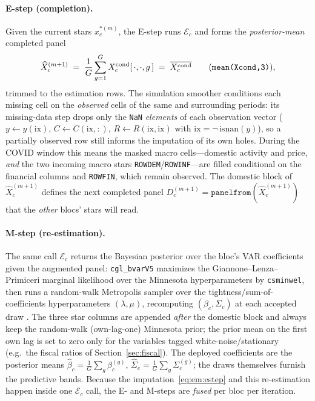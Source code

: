 \documentclass[11pt]{article}
\theoremstyle{definition}
\theoremstyle{remark}
\begin{document}
\paragraph{E-step (completion).} Given the current stars $x^{*(m)}_c$, the E-step
runs $\mathcal{E}_c$ and forms the \emph{posterior-mean} completed panel
\begin{equation}\label{eq:em:estep}
  \widehat{X}^{(m+1)}_c
  \;=\; \frac{1}{G}\sum_{g=1}^{G} X^{\text{cond}}_{c}[\,\cdot,\cdot,g\,]
  \;=\; \overline{X^{\text{cond}}_c}
  \qquad\text{(\texttt{mean(Xcond,3)})},
\end{equation}
trimmed to the estimation rows. The simulation smoother conditions each missing
cell on the \emph{observed} cells of the same and surrounding periods: its
missing-data step drops only the \texttt{NaN} \emph{elements} of each observation
vector ($y\!\leftarrow\!y(\mathrm{ix})$, $C\!\leftarrow\!C(\mathrm{ix},:)$,
$R\!\leftarrow\!R(\mathrm{ix},\mathrm{ix})$ with $\mathrm{ix}=\lnot\,\mathrm{isnan}(y)$),
so a partially observed row still informs the imputation of its own holes. During
the COVID window this means the masked macro cells---domestic activity and price,
\emph{and} the two incoming macro stars \texttt{ROWDEM}/\texttt{ROWINF}---are
filled conditional on the financial columns and \texttt{ROWFIN}, which remain
observed. The domestic block of $\widehat{X}^{(m+1)}_c$ defines the next
completed panel $D^{(m+1)}_c=\texttt{panelfrom}(\widehat{X}^{(m+1)}_c)$ that the
\emph{other} blocs' stars will read.

\paragraph{M-step (re-estimation).} The same call $\mathcal{E}_c$ returns the
Bayesian posterior over the bloc's VAR coefficients given the augmented panel:
\texttt{cgl\_bvarV5} maximizes the Giannone--Lenza--Primiceri marginal likelihood
over the Minnesota hyperparameters by \texttt{csminwel}, then runs a
random-walk Metropolis sampler over the tightness/sum-of-coefficients
hyperparameters $(\lambda,\mu)$, recomputing $(\beta_c,\Sigma_c)$ at each accepted
draw \citep{Giannone2015,BanburaGiannoneLenza2015}. The three star columns are
appended \emph{after} the domestic block and always keep the random-walk
(own-lag-one) Minnesota prior; the prior mean on the first own lag is set to zero
only for the variables tagged white-noise/stationary (e.g.\ the fiscal
ratios of Section~\ref{sec:fiscal}). The deployed coefficients are the
posterior means $\hat\beta_c=\frac1G\sum_g\beta_c^{(g)}$,
$\hat\Sigma_c=\frac1G\sum_g\Sigma_c^{(g)}$; the draws themselves furnish the
predictive bands. Because the imputation~\eqref{eq:em:estep} and this
re-estimation happen inside one $\mathcal{E}_c$ call, the E- and M-steps are
\emph{fused} per bloc per iteration.
\end{document}
